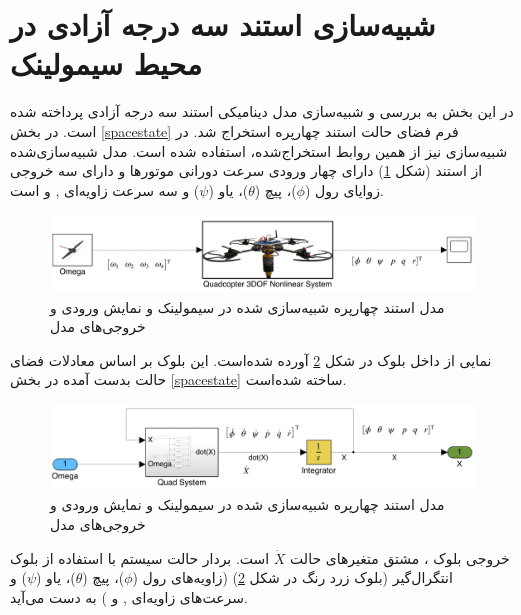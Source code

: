 \section{شبیه‌سازی استند سه درجه آزادی در محیط سیمولینک}\label{quadall3}
در این بخش به بررسی و شبیه‌سازی مدل دینامیکی استند سه درجه آزادی پرداخته شده است. در بخش \ref{spacestate} فرم فضای حالت استند چهارپره استخراج شد. در شبیه‌سازی نیز از همین روابط استخراج‌شده، استفاده شده است. مدل شبیه‌سازی‌شده از استند (شکل \ref{quadsimulink}) دارای چهار ورودی سرعت دورانی موتورها  و دارای سه خروجی زوایای رول ($\phi$)، پیچ ($\theta$)، یاو ($\psi$) و  سه سرعت زاویه‌ای
 ,
 و 
 است.
 
 	\hspace*{0.5cm}
\begin{figure}[H]
	\includegraphics[width=16cm]{../Figures/QuadSimulation/Stand_Model.png}
	\centering
	\caption{مدل استند چهارپره شبیه‌سازی شده در سیمولینک و نمایش ورودی و خروجی‌های مدل}
	\label{quadsimulink}
\end{figure}
نمایی از داخل بلوک
در شکل \ref{Quad3DOF} آورده شده‌است. این بلوک بر اساس معادلات فضای حالت بدست آمده در بخش
\ref{spacestate}
ساخته شده‌است.
	\hspace*{1.5cm}
\begin{figure}[H]
	\includegraphics[width=16cm]{../Figures/QuadSimulation/Integrator.png}
	\centering
	\caption{مدل استند چهارپره شبیه‌سازی شده در سیمولینک و نمایش ورودی و خروجی‌های مدل}
	\label{Quad3DOF}
\end{figure}
خروجی بلوک
،
مشتق متغیرهای حالت 
$\dot X$
است. بردار حالت سیستم با استفاده از بلوک انتگرال‌گیر (بلوک زرد رنگ در شکل \ref{Quad3DOF})
 (زاویه‌های رول ($\phi$)، پیچ ($\theta$)، یاو ($\psi$) و سرعت‌های زاویه‌ای‌
 ,
و 
)
به دست می‌آید.

